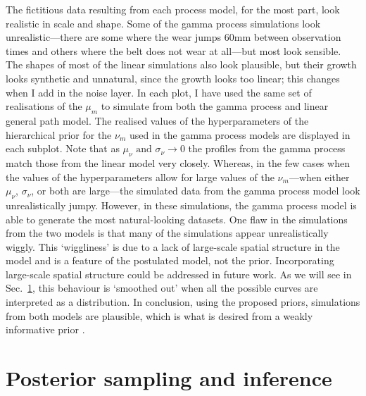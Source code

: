 The fictitious data resulting from each process model, for the most part, look realistic in scale and shape. Some of the gamma process simulations look unrealistic---there are some where the wear jumps $60$mm between observation times and others where the belt does not wear at all---but most look sensible. The shapes of most of the linear simulations also look plausible, but their growth looks synthetic and unnatural, since the growth looks too linear; this changes when I add in the noise layer. In each plot, I have used the same set of realisations of the $\mu_m$ to simulate from both the gamma process and linear general path model. The realised values of the hyperparameters of the hierarchical prior for the $\nu_m$ used in the gamma process models are displayed in each subplot. Note that as $\mu_\nu \text{ and } \sigma_\nu \longrightarrow 0$ the profiles from the gamma process match those from the linear model very closely. Whereas, in the few cases when the values of the hyperparameters allow for large values of the $\nu_m$---when either $\mu_\nu$, $\sigma_\nu$, or both are large---the simulated data from the gamma process model look unrealistically jumpy. However, in these simulations, the gamma process model is able to generate the most natural-looking datasets. One flaw in the simulations from the two models is that many of the simulations appear unrealistically wiggly. This `wiggliness' is due to a lack of large-scale spatial structure in the model and is a feature of the postulated model, not the prior. Incorporating large-scale spatial structure could be addressed in future work. As we will see in Sec.~\ref{sec:belt-wear-fitting}, this behaviour is `smoothed out' when all the possible curves are interpreted as a distribution. In conclusion, using the proposed priors, simulations from both models are plausible, which is what is desired from a weakly informative prior \citep{gabry_vis_2019}.

\section{Posterior sampling and inference} \label{sec:belt-wear-fitting}

